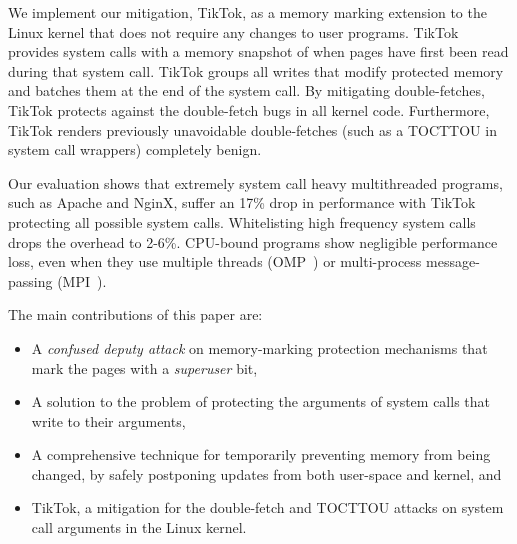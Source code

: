 \documentclass[conference]{IEEEtran}
\newcommand{\sysname}{TikTok}
\newcommand{\roughevaloverheadbad}{17\%}
\newcommand{\roughevaloverheadbetter}{2-6\%}
\begin{document}
We implement our mitigation, \sysname{}, as a memory marking extension to the
Linux kernel that does not require any changes to user programs.
\sysname{} provides system calls with a memory snapshot of when
pages have first been read during that system call.
\sysname{} groups all writes that modify protected memory and batches them at
the end of the system call. By mitigating
double-fetches, \sysname{} protects against the double-fetch bugs in all kernel
code. Furthermore, \sysname{} renders
previously unavoidable double-fetches (such as a TOCTTOU in system call
wrappers) completely benign. 


Our evaluation shows that extremely system call heavy multithreaded programs,
such as Apache and NginX, suffer an \roughevaloverheadbad{} drop in performance
with \sysname{} protecting all possible system calls. Whitelisting high
frequency system calls drops the overhead to \roughevaloverheadbetter{}. CPU-bound
programs show negligible performance loss, even when they
use multiple threads (OMP~\cite{dagum1998openmp}) or multi-process
message-passing (MPI~\cite{snir1998mpi}).



The main contributions of this paper are:

\begin{itemize}

\item A \emph{confused deputy attack} on memory-marking protection mechanisms
that mark the pages with a \emph{superuser} bit, %
\item A solution to the problem of protecting the arguments of system calls that
write to their arguments,
\item A comprehensive technique for temporarily preventing memory from being
      changed, by safely postponing updates from both user-space and kernel, and
\item \sysname{}, a mitigation for the double-fetch and TOCTTOU attacks on
      system call arguments in the Linux kernel.
\end{itemize}
\end{document}
